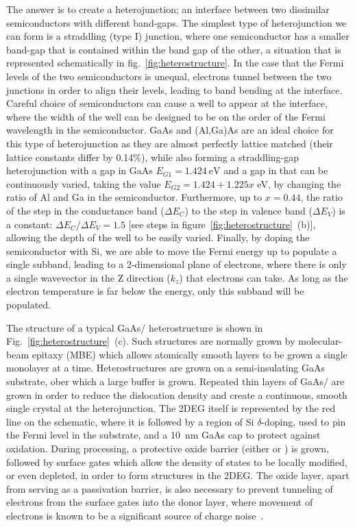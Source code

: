 The answer is to create a heterojunction; an interface between two dissimilar semiconductors with different band-gaps. The
simplest type of heterojunction we can form is a straddling (type I) junction, where one semiconductor has a smaller band-gap
that is contained within the band gap of the other, a situation that is represented schematically in fig.~\ref{fig:heterostructure}. 
In the case that the Fermi levels of the two semiconductors is unequal, electrons tunnel between the two junctions in order to align 
their levels, leading to band bending at the interface. Careful choice of semiconductors can cause a well to appear at the interface, 
where the width of the well can be designed to be on the order of the Fermi wavelength in the semiconductor. GaAs and (Al,Ga)As are 
an ideal choice for this type of heterojunction as  they are almost perfectly lattice matched (their lattice constants differ by 0.14\%), 
while also forming a straddling-gap heterojunction with a gap in GaAs $E_{G1} = \SI{1.424}{\electronvolt}$ and a gap in
 that can be continuously varied, taking the value $E_{G2} = 1.424 + 1.225x$ \si{\electronvolt}, by
changing the ratio of Al and Ga in the semiconductor. Furthermore, up to $x = 0.44$, the ratio of the step in the conductance
band ($\Delta E_C$) to the step in valence band ($\Delta E_V$) is a constant: $\Delta E_C/\Delta E_V = 1.5$\cite{adachi1993properties}
[see steps in figure~\ref{fig:heterostructure}~(b)], allowing the depth of the well to be easily varied.
Finally, by doping the semiconductor with Si, we are able to move the Fermi energy up to populate a single subband, leading to a 
2-dimensional plane of electrons, where there is only a single wavevector in the Z direction ($k_z$) that electrons can take. As long
as the electron temperature is far below the energy, only this subband will be populated.

The structure of a typical GaAs/ heterostructure is shown in Fig.~\ref{fig:heterostructure}~(c). Such structures
are normally grown by molecular-beam epitaxy (MBE) which allows atomically smooth layers to be grown a single monolayer
at a time. Heterostructures are grown on a semi-insulating GaAs substrate, ober which a large buffer is grown.
Repeated thin layers of GaAs/ are grown in order to reduce the dislocation density
and create a continuous, smooth single crystal at the heterojunction. The 2DEG itself is represented by the red line
on the schematic, where it is followed by a region of Si $\delta$-doping, used to pin the Fermi level in the substrate, and
a \SI{10}{\nano\meter} GaAs cap to protect against oxidation. During processing, a protective oxide barrier (either 
or ) is grown, followed by surface gates which allow the density of states to be locally modified, or even depleted,
in order to form structures in the 2DEG. The oxide layer, apart from serving as a passivation barrier, is also necessary to 
prevent tunneling of electrons from the surface gates into the donor layer, where movement of electrons is known to be a significant
source of charge noise~\cite{PhysRevB.72.115331,PhysRevApplied.9.034008}.

